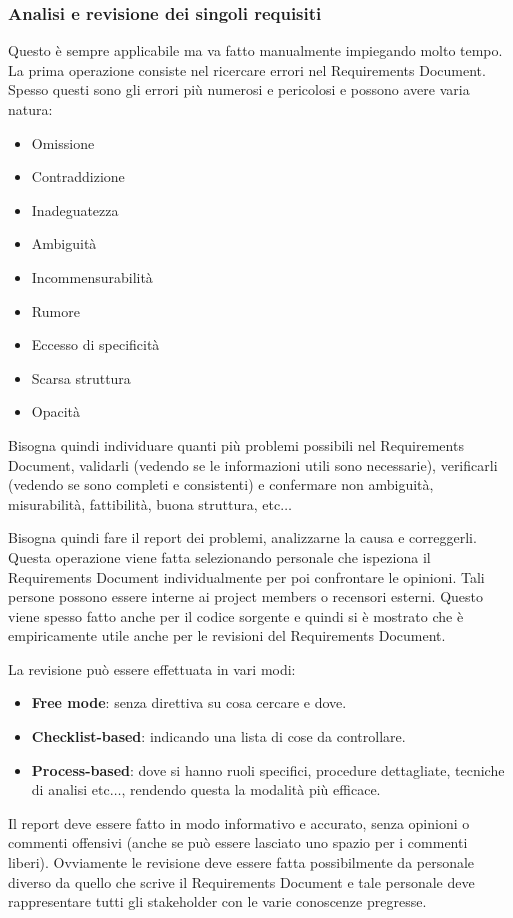 \subsubsection{Analisi e revisione dei singoli requisiti}
Questo è sempre applicabile ma va fatto manualmente impiegando molto tempo. La
prima operazione consiste nel ricercare errori nel Requirements Document. Spesso
questi sono gli errori più numerosi e pericolosi e possono avere varia natura:
\begin{itemize}
    \item Omissione
    \item Contraddizione
    \item Inadeguatezza
    \item Ambiguità
    \item Incommensurabilità
    \item Rumore
    \item Eccesso di specificità
    \item Scarsa struttura
    \item Opacità
\end{itemize}
Bisogna quindi individuare quanti più problemi possibili nel Requirements Document,
validarli (vedendo se le informazioni utili sono necessarie), verificarli (vedendo
se sono completi e consistenti) e confermare non ambiguità, misurabilità,
fattibilità, buona struttura, etc$\dots$

Bisogna quindi fare il report dei problemi, analizzarne la causa e correggerli.
Questa operazione viene fatta selezionando personale che ispeziona il Requirements
Document individualmente per poi confrontare le opinioni. Tali persone possono
essere interne ai project members o recensori esterni. Questo viene spesso fatto
anche per il codice sorgente e quindi si è mostrato che è empiricamente utile
anche per le revisioni del Requirements Document.

La revisione può essere effettuata in vari modi:
\begin{itemize}
    \item \textbf{Free mode}: senza direttiva su cosa cercare e dove.
    \item \textbf{Checklist-based}: indicando una lista di cose da controllare.
    \item \textbf{Process-based}: dove si hanno ruoli specifici, procedure dettagliate,
          tecniche di analisi etc$\dots$, rendendo questa la modalità più efficace.
\end{itemize}
Il report deve essere fatto in modo informativo e accurato, senza opinioni o
commenti offensivi (anche se può essere lasciato uno spazio per i commenti liberi).
Ovviamente le revisione deve essere fatta possibilmente da personale diverso da
quello che scrive il Requirements Document e tale personale deve rappresentare
tutti gli stakeholder con le varie conoscenze pregresse.

